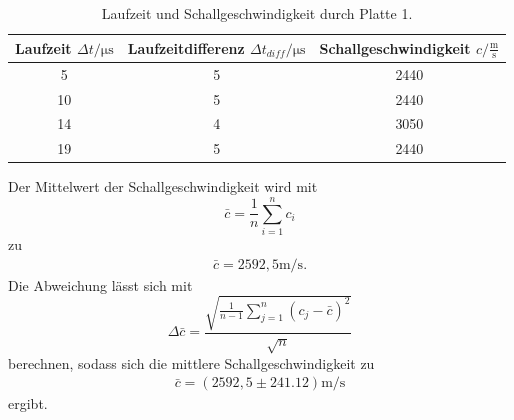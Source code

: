 \begin{table}[H]
  \centering
  \caption{Laufzeit und Schallgeschwindigkeit durch Platte 1.}
  \label{tab:ImpLaufzeit}
  \begin{tabular}{S[table-format=2.0] S[table-format=1.0] S[table-format=4.0] }
  \toprule
  {Laufzeit $\Delta t / \si{\micro\second}$} & {Laufzeitdifferenz $\Delta t_{diff} / \si{\micro\second}$} & {Schallgeschwindigkeit $c / \frac{\si{\meter}}{\si{\second}}$}\\
     & 5 & 2440  \\
    10  & 5 & 2440  \\
    14  & 4 & 3050  \\
    19  & 5 & 2440  \\
  \bottomrule
  \end{tabular}
\end{table}
Der Mittelwert der Schallgeschwindigkeit wird mit 
\begin{equation}
  \bar{c}=\frac{1}{n} \sum_{i=1}^n c_i \label{eqn:Mittelwert}
\end{equation}
zu
\begin{align*}
  \bar{c}=2592,5 \si{\meter\per\second}.
\end{align*}
Die Abweichung lässt sich mit
\begin{equation}
  \Delta \bar{c} = \frac{\sqrt{\frac{1}{n-1}\sum_{j=1}^n (c_j-\bar{c})^2}}{\sqrt{n}} \label{eqn:standabw}
\end{equation}
berechnen, sodass sich die mittlere Schallgeschwindigkeit zu
\begin{align*}
  \bar{c}= (2592,5 \pm 241.12) \si{\meter\per\second}
\end{align*}
ergibt.

